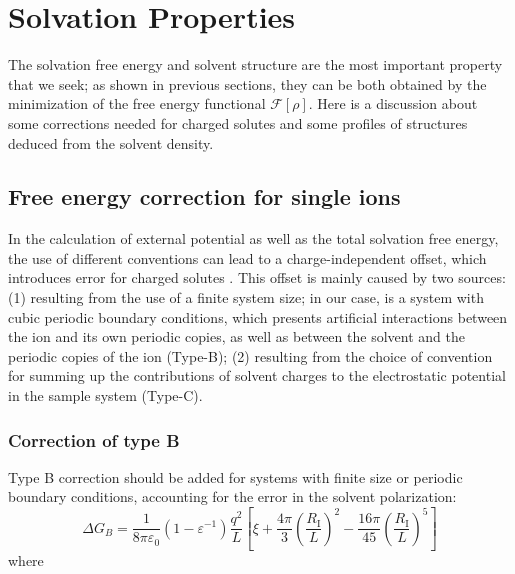 
\chapter{Solvation Properties\label{chpt:solvation-properties}}

The solvation free energy and solvent structure are the most important
property that we seek; as shown in previous sections, they can be
both obtained by the minimization of the free energy functional $\mathcal{F}[\rho]$.
Here is a discussion about some corrections needed for charged solutes
and some profiles of structures deduced from the solvent density.

\section{Free energy correction for single ions\label{sec:Free-energy-correction}}

In the calculation of external potential as well as the total solvation
free energy, the use of different conventions can lead to a charge-independent
offset, which introduces error for charged solutes \citep{Kastenholz_2006_I,Kastenholz_2006_II,Hunenberger_book}.
This offset is mainly caused by two sources: (1) resulting from the
use of a finite system size; in our case, is a system with cubic periodic
boundary conditions, which presents artificial interactions between
the ion and its own periodic copies, as well as between the solvent
and the periodic copies of the ion (Type-B); (2) resulting from the
choice of convention for summing up the contributions of solvent charges
to the electrostatic potential in the sample system (Type-C).

\subsection{Correction of type B}

Type B correction should be added for systems with finite size or
periodic boundary conditions, accounting for the error in the solvent
polarization: 
\begin{equation}
\Delta G_{B}=\frac{1}{8\pi\varepsilon_{0}}\left(1-\varepsilon^{-1}\right)\frac{q^{2}}{L}\left[\xi+\frac{4\pi}{3}\left(\frac{R_{\mathrm{I}}}{L}\right)^{2}-\frac{16\pi}{45}\left(\frac{R_{\mathrm{I}}}{L}\right)^{5}\right]\label{eq:corr-B}
\end{equation}
where

